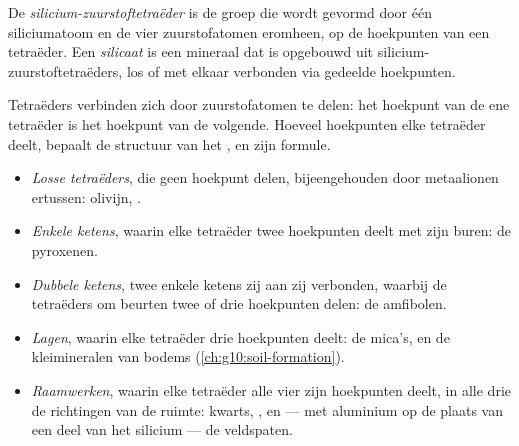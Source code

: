 \begin{definition}\label{def:g11:minerals:silicate}
De \emph{silicium-zuurstoftetraëder} is
de groep  die wordt gevormd door één siliciumatoom en de vier zuurstofatomen
eromheen, op de hoekpunten van een tetraëder. Een
\emph{silicaat} is een mineraal dat is opgebouwd uit
silicium-zuurstoftetraëders, los of met elkaar verbonden via gedeelde hoekpunten.
\end{definition}

Tetraëders verbinden zich door zuurstofatomen te delen: het hoekpunt van de ene tetraëder is het
hoekpunt van de volgende. Hoeveel hoekpunten elke tetraëder deelt, bepaalt de
structuur van het , en zijn formule.
\begin{itemize}
  \item \emph{Losse tetraëders}, die geen hoekpunt delen, bijeengehouden door
        metaalionen ertussen: olivijn, .
  \item \emph{Enkele ketens}, waarin elke tetraëder twee hoekpunten deelt met zijn
        buren: de pyroxenen.
  \item \emph{Dubbele ketens}, twee enkele ketens zij aan zij verbonden, waarbij de
        tetraëders om beurten twee of drie hoekpunten delen: de amfibolen.
  \item \emph{Lagen}, waarin elke tetraëder drie hoekpunten deelt: de mica's,
        en de kleimineralen van bodems (\cref{ch:g10:soil-formation}).
  \item \emph{Raamwerken}, waarin elke tetraëder alle vier zijn hoekpunten deelt, in alle
        drie de richtingen van de ruimte: kwarts, , en --- met aluminium
        op de plaats van een deel van het silicium --- de veldspaten.
\end{itemize}

